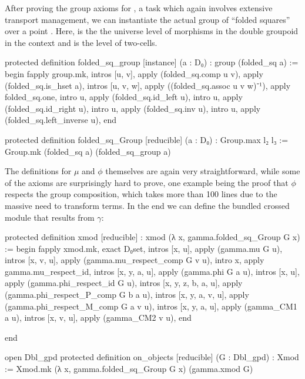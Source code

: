 After proving the group axioms for , a task which again involves
extensive transport management, we can instantiate the actual group of ``folded
squares'' over a point .
Here,  is the the universe level of morphisms in the double groupoid in
the context and  is the level of two-cells.
\begin{leancodebr}
  protected definition folded_sq_group [instance] (a : D₀) :
    group (folded_sq a) :=
  begin
    fapply group.mk,
      intros [u, v], apply (folded_sq.comp u v),
      apply (folded_sq.is_hset a),
      intros [u, v, w], apply ((folded_sq.assoc u v w)⁻¹),
      apply folded_sq.one,
      intro u, apply (folded_sq.id_left u),
      intro u, apply (folded_sq.id_right u),
      intro u, apply (folded_sq.inv u),
      intro u, apply (folded_sq.left_inverse u),
  end

  protected definition folded_sq_Group [reducible] (a : D₀) :
    Group.{max l₂ l₃} :=
  Group.mk (folded_sq a) (folded_sq_group a)
\end{leancodebr}

The definitions for $\mu$ and $\phi$ themselves are again very straightforward, while
some of the axioms are surprisingly hard to prove, one example being the proof that
$\phi$ respects the group composition, which takes more than 100 lines due to
the massive need to transform  terms.
In the end we can define the bundled crossed module that results from $\gamma$:
\begin{leancodebr}
  protected definition xmod [reducible] : 
    xmod (λ x, gamma.folded_sq_Group G x) :=
  begin
    fapply xmod.mk,
      exact D₀set,
      intros [x, u], apply (gamma.mu G u),
      intros [x, v, u], apply (gamma.mu_respect_comp G v u),
      intro x, apply gamma.mu_respect_id,
      intros [x, y, a, u], apply (gamma.phi G a u),
      intros [x, u], apply (gamma.phi_respect_id G u),
      intros [x, y, z, b, a, u], apply (gamma.phi_respect_P_comp G b a u),
      intros [x, y, a, v, u], apply (gamma.phi_respect_M_comp G a v u),
      intros [x, y, a, u], apply (gamma_CM1 a u),
      intros [x, v, u], apply (gamma_CM2 v u),
  end

  end

  open Dbl_gpd
  protected definition on_objects [reducible] (G : Dbl_gpd) : Xmod :=
  Xmod.mk (λ x, gamma.folded_sq_Group G x) (gamma.xmod G)
\end{leancodebr}

